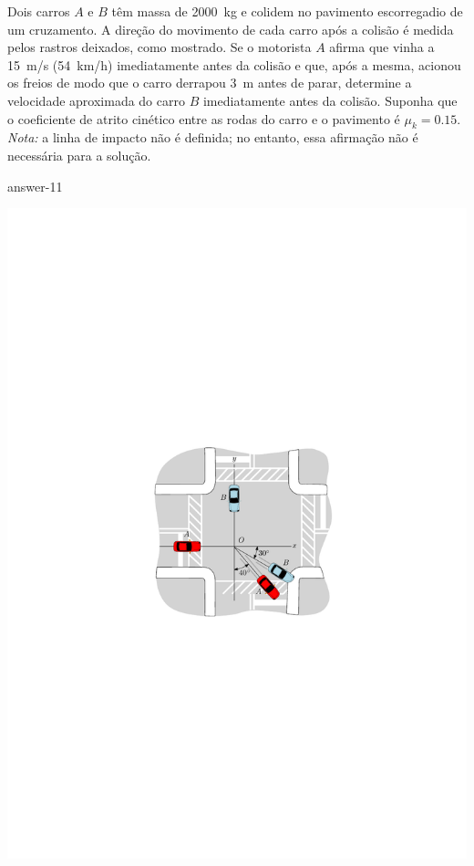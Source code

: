 \item Dois carros $A$ e $B$ têm massa de \SI{2000}{\kilogram} e colidem no pavimento escorregadio de um cruzamento. A direção do movimento de cada carro após a colisão é medida pelos rastros deixados, como mostrado. Se o motorista $A$ afirma que vinha a \SI{15}{\meter/\second} (\SI{54}{\kilo\meter/\hour}) imediatamente antes da colisão e que, após a mesma, acionou os freios de modo que o carro derrapou \SI{3}{\meter} antes de parar, determine a velocidade aproximada do carro $B$ imediatamente antes da colisão. Suponha que o coeficiente de atrito cinético entre as rodas do carro e o pavimento é $\mu_{k}=0.15$. \textit{Nota:} a linha de impacto não é definida; no entanto, essa afirmação não é necessária para a solução.

{answer-11}

\vspace{-1cm}
\begin{flushright}
	\includegraphics[scale=1.3]{images/draw_14}
\end{flushright}